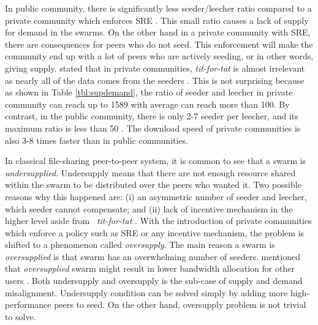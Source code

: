 In public community, there is significantly less seeder/leecher ratio compared to a private community which enforces SRE \cite{2010:pubpriv:meulpolder,2009:demandsupplyres:andrade}. This small ratio causes a lack of supply for demand in the swarms. On the other hand in a private community with SRE, there are consequences for peers who do not seed. This enforcement will make the community end up with a lot of peers who are actively seeding, or in other words, giving supply. \citeauthor{2010:pubpriv:meulpolder} stated that in private communities, \textit{tit-for-tat} is almost irrelevant as nearly all of the data comes from the seeders \cite{2010:pubpriv:meulpolder}. This is not surprising because as shown in Table \ref{tbl:supdemand}, the ratio of seeder and leecher in private community can reach up to 1589 with average can reach more than 100. By contrast, in the public community, there is only 2-7 seeder per leecher, and its maximum ratio is less than 50 \cite{2010:pubpriv:meulpolder}. The download speed of private communities is also 3-8 times faster than in public communities. 

In classical file-sharing peer-to-peer system, it is common to see that a swarm is \textit{undersupplied}. Undersupply means that there are not enough resource shared within the swarm to be distributed over the peers who wanted it. Two possible reasons why this happened are: (i) an asymmetric number of seeder and leecher, which seeder cannot compensate; and (ii) lack of incentive mechanism in the higher level aside from \bt~\textit{tit-for-tat} \cite{2009:demandsupplyres:andrade}. With the introduction of private communities which enforce a policy such as SRE or any incentive mechanism, the problem is shifted to a phenomenon called \textit{oversupply}. The main reason a swarm is \textit{oversupplied} is that swarm has an overwhelming number of seeders. \citeauthor{2013:survivepriv:jia} mentioned that \textit{oversupplied} swarm might result in lower bandwidth allocation for other users \cite{2013:survivepriv:jia}. Both undersupply and oversupply is the sub-case of supply and demand misalignment. Undersupply condition can be solved simply by adding more high-performance peers to seed. On the other hand, oversupply problem is not trivial to solve.

